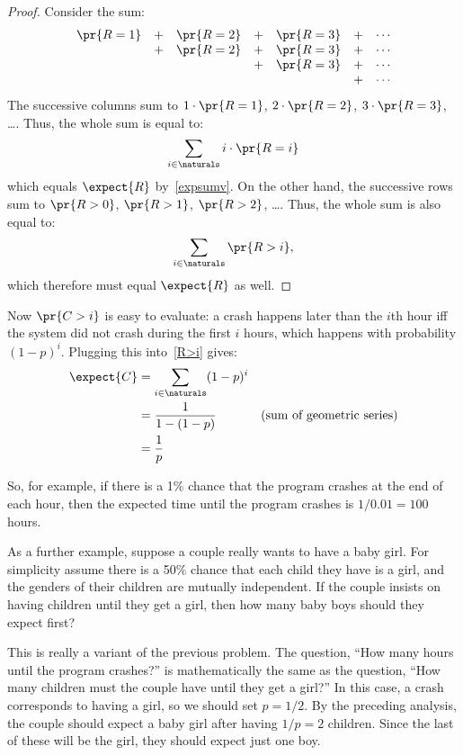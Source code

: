 \begin{proof}
Consider the sum:
%
\[
\begin{array}{ccccccc}
\pr{R = 1} & + & \pr{R = 2} & + & \pr{R = 3} & + & \cdots \\
           & + & \pr{R = 2} & + & \pr{R = 3} & + & \cdots \\
           &   &            & + & \pr{R = 3} & + & \cdots \\
           &   &            &   &            & + & \cdots
\end{array}
\]
%
The successive columns sum to $1 \cdot \pr{R = 1}$, $2 \cdot \pr{R = 2}$,
$3 \cdot \pr{R = 3}$, \dots.  Thus, the whole sum is equal to:
%
\[
\sum_{i \in \naturals} i \cdot \pr{R = i}
\]
which equals $\expect{R}$ by~\eqref{expsumv}.  On the other hand, the
successive rows sum to $\pr{R > 0}$, $\pr{R > 1}$, $\pr{R > 2}$, \dots.
Thus, the whole sum is also equal to:
%
\[
\sum_{i \in \naturals} \pr{R > i},
\]
%
which therefore must equal $\expect{R}$ as well.
\end{proof}

Now $\pr{C > i}$ is easy to evaluate: a crash happens later than the $i$th
hour iff the system did not crash during the first $i$ hours, which
happens with probability $(1-p)^i$.  Plugging this into~\eqref{R>i} gives:
%
\begin{align*}
\expect{C} & = \sum_{i \in \naturals} (1-p)^i \\
       & = \frac{1}{1 - (1-p)} & \text{(sum of geometric series)}\\
       & = \frac{1}{p}
\end{align*}
\fi

So, for example, if there is a 1\% chance that the program crashes at
the end of each hour, then the expected time until the program crashes
is $1 / 0.01 = 100$ hours.  

As a further example, suppose a couple really wants to have a baby girl.
For simplicity assume there is a 50\% chance that each child they have is a
girl, and the genders of their children are mutually independent.  If the
couple insists on having children until they get a girl, then how many
baby boys should they expect first?

This is really a variant of the previous problem.  The question, ``How
many hours until the program crashes?'' is mathematically the same as
the question, ``How many children must the couple have until they get
a girl?''  In this case, a crash corresponds to having a girl, so we
should set $p = 1/2$.  By the preceding analysis, the couple
should expect a baby girl after having $1/p = 2$ children.  Since the
last of these will be the girl, they should expect just one boy.

